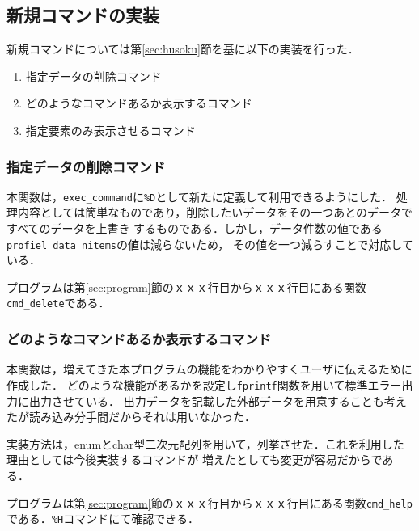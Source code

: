 \documentclass[a4j,11pt]{jarticle}
\begin{document}
\subsection{新規コマンドの実装}
新規コマンドについては第\ref{sec:husoku}節を基に以下の実装を行った．
\begin{enumerate}
\setlength{\parskip}{2pt} \setlength{\itemsep}{2pt}
    \item 指定データの削除コマンド
    \item どのようなコマンドあるか表示するコマンド
    \item 指定要素のみ表示させるコマンド
\end{enumerate}
\subsubsection{指定データの削除コマンド}\label{sec:sakujyo}
本関数は，\verb|exec_command|に\verb|%D|として新たに定義して利用できるようにした．
処理内容としては簡単なものであり，削除したいデータをその一つあとのデータですべてのデータを上書き
するものである．しかし，データ件数の値である\verb|profiel_data_nitems|の値は減らないため，
その値を一つ減らすことで対応している．

プログラムは第\ref{sec:program}節のｘｘｘ行目からｘｘｘ行目にある関数\verb|cmd_delete|である．
\subsubsection{どのようなコマンドあるか表示するコマンド}\label{sec:help}
本関数は，増えてきた本プログラムの機能をわかりやすくユーザに伝えるために作成した．
どのような機能があるかを設定し\verb|fprintf|関数を用いて標準エラー出力に出力させている．
出力データを記載した外部データを用意することも考えたが読み込み分手間だからそれは用いなかった．

実装方法は，enumとchar型二次元配列を用いて，列挙させた．これを利用した理由としては今後実装するコマンドが
増えたとしても変更が容易だからである．

プログラムは第\ref{sec:program}節のｘｘｘ行目からｘｘｘ行目にある関数\verb|cmd_help|である．\verb|%H|コマンドにて確認できる．
\end{document}

